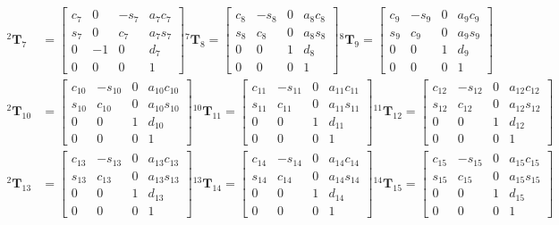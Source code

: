 \begin{align*}
    {}^2\boldsymbol{T}_7&=
    \begin{bmatrix}c_7&0&-s_7&a_7c_7\\s_7&0&c_7&a_7s_7\\0&-1&0&d_7\\0&0&0&1\end{bmatrix}
    {}^7\boldsymbol{T}_8=
    \begin{bmatrix}c_8&-s_8&0&a_8c_8\\s_8&c_8&0&a_8s_8\\0&0&1&d_8\\0&0&0&1\end{bmatrix}
    {}^8\boldsymbol{T}_9=
    \begin{bmatrix}c_9&-s_9&0&a_9c_9\\s_9&c_9&0&a_9s_9\\0&0&1&d_9\\0&0&0&1\end{bmatrix}
    \\
    {}^2\boldsymbol{T}_{10}&=
    \begin{bmatrix}c_{10}&-s_{10}&0&a_{10}c_{10}\\s_{10}&c_{10}&0&a_{10}s_{10}\\0&0&1&d_{10}\\0&0&0&1\end{bmatrix}
    {}^{10}\boldsymbol{T}_{11}=
    \begin{bmatrix}c_{11}&-s_{11}&0&a_{11}c_{11}\\s_{11}&c_{11}&0&a_{11}s_{11}\\0&0&1&d_{11}\\0&0&0&1\end{bmatrix}
    {}^{11}\boldsymbol{T}_{12}=
    \begin{bmatrix}c_{12}&-s_{12}&0&a_{12}c_{12}\\s_{12}&c_{12}&0&a_{12}s_{12}\\0&0&1&d_{12}\\0&0&0&1\end{bmatrix}
    \\
    {}^2\boldsymbol{T}_{13}&=
    \begin{bmatrix}c_{13}&-s_{13}&0&a_{13}c_{13}\\s_{13}&c_{13}&0&a_{13}s_{13}\\0&0&1&d_{13}\\0&0&0&1\end{bmatrix}
    {}^{13}\boldsymbol{T}_{14}=
    \begin{bmatrix}c_{14}&-s_{14}&0&a_{14}c_{14}\\s_{14}&c_{14}&0&a_{14}s_{14}\\0&0&1&d_{14}\\0&0&0&1\end{bmatrix}
    {}^{14}\boldsymbol{T}_{15}=
    \begin{bmatrix}c_{15}&-s_{15}&0&a_{15}c_{15}\\s_{15}&c_{15}&0&a_{15}s_{15}\\0&0&1&d_{15}\\0&0&0&1\end{bmatrix}
\end{align*}

